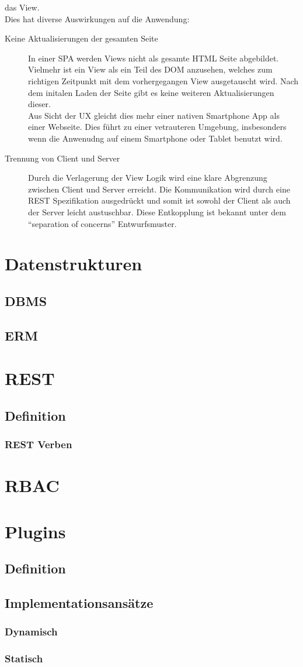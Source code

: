 das View.\\
Dies hat diverse Auswirkungen auf die Anwendung: 
\begin{description}
  \item[Keine Aktualisierungen der gesamten Seite]In einer \ac{SPA} werden Views
    nicht als gesamte \ac{HTML} Seite abgebildet. Vielmehr ist ein View als ein
    Teil des \ac{DOM} anzusehen, welches zum richtigen Zeitpunkt mit dem
    vorhergegangen View ausgetauscht wird. Nach dem initalen Laden der Seite
    gibt es keine weiteren Aktualisierungen dieser.\\
    Aus Sicht der \ac{UX}
    gleicht dies mehr einer nativen Smartphone App als einer Webseite. Dies
    führt zu einer vetrauteren Umgebung, insbesonders wenn die Anwenudng auf
    einem Smartphone oder Tablet benutzt wird.
  \item[Trennung von Client und Server]Durch die Verlagerung der
    View Logik wird eine klare Abgrenzung zwischen Client und Server erreicht.
    Die Kommunikation wird durch eine \ac{REST} Spezifikation ausgedrückt und
    somit ist sowohl der Client als auch der Server leicht austuschbar. Diese
    Entkopplung ist bekannt unter dem ``separation of concerns'' Entwurfsmuster\cite{cleancode}.
\end{description}

\section{Datenstrukturen}
\subsection{\acl{DBMS}}
\subsection{\acl{ERM}}
\section{\acl{REST}}
\subsection{Definition}
\subsubsection{\acs{REST} Verben}
\section{\acl{RBAC}}
\section{Plugins}
\subsection{Definition}
\subsection{Implementationsansätze}
\subsubsection{Dynamisch}
\subsubsection{Statisch}
